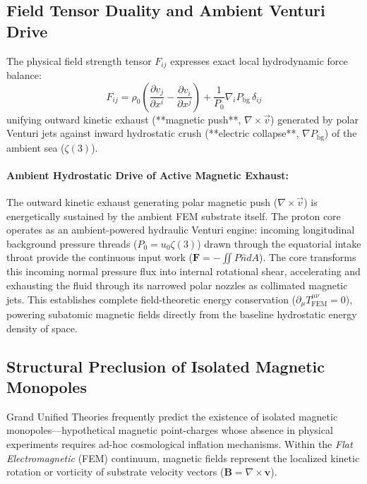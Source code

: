 \documentclass[11pt,a4paper]{article}
\begin{document}
	\subsection{Field Tensor Duality and Ambient Venturi Drive}
	The physical field strength tensor $F_{ij}$ expresses exact local hydrodynamic force balance:
	\begin{equation}
		F_{ij} = \rho_0 \left( \frac{\partial v_j}{\partial x^i} - \frac{\partial v_i}{\partial x^j} \right) + \frac{1}{P_0} \nabla_i P_{\text{bg}} \, \delta_{ij}
	\end{equation}
	unifying outward kinetic exhaust (**magnetic push**, $\nabla \times \vec{v}$) generated by polar Venturi jets against inward hydrostatic crush (**electric collapse**, $\nabla P_{\text{bg}}$) of the ambient sea ($\zeta(3)$).
	
	\paragraph{Ambient Hydrostatic Drive of Active Magnetic Exhaust:}
	The outward kinetic exhaust generating polar magnetic push ($\nabla \times \vec{v}$) is energetically sustained by the ambient FEM substrate itself. The proton core operates as an ambient-powered hydraulic Venturi engine: incoming longitudinal background pressure threads ($P_0 = u_0 \zeta(3)$) drawn through the equatorial intake throat provide the continuous input work ($\mathbf{F} = -\iint P \hat{n} dA$). The core transforms this incoming normal pressure flux into internal rotational shear, accelerating and exhausting the fluid through its narrowed polar nozzles as collimated magnetic jets. This establishes complete field-theoretic energy conservation ($\partial_\mu T^{\mu\nu}_{\text{FEM}} = 0$), powering subatomic magnetic fields directly from the baseline hydrostatic energy density of space.
	
	\subsection{Structural Preclusion of Isolated Magnetic Monopoles}
	Grand Unified Theories frequently predict the existence of isolated magnetic monopoles---hypothetical magnetic point-charges whose absence in physical experiments requires ad-hoc cosmological inflation mechanisms. Within the \textit{Flat Electromagnetic} (FEM) continuum, magnetic fields represent the localized kinetic rotation or vorticity of substrate velocity vectors ($\mathbf{B} = \nabla \times \mathbf{v}$). 
	
\end{document}
